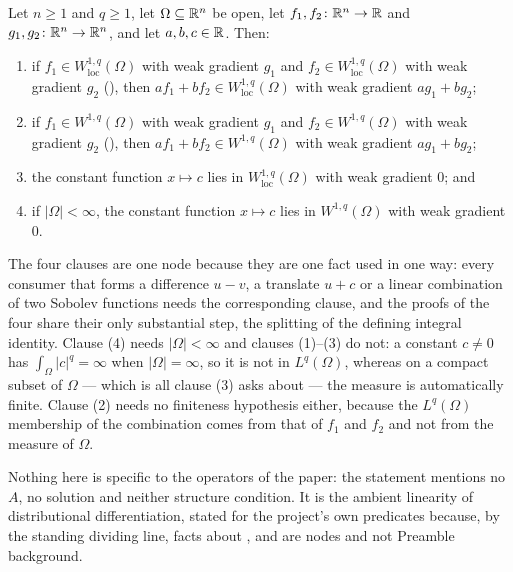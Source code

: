 \begin{lemma}
Let $n\ge1$ and $q\ge1$, let $\Omega\subseteq\mathbb{R}^n$ be open, let
$f_1,f_2\colon\mathbb{R}^n\to\mathbb{R}$ and $g_1,g_2\colon\mathbb{R}^n\to\mathbb{R}^n$, and let
$a,b,c\in\mathbb{R}$.  Then:
\begin{enumerate}
\item if $f_1\in W^{1,q}_{\mathrm{loc}}(\Omega)$ with weak gradient $g_1$ and
  $f_2\in W^{1,q}_{\mathrm{loc}}(\Omega)$ with weak gradient $g_2$
  (), then
  $af_1+bf_2\in W^{1,q}_{\mathrm{loc}}(\Omega)$ with weak gradient
  $ag_1+bg_2$;
\item if $f_1\in W^{1,q}(\Omega)$ with weak gradient $g_1$ and
  $f_2\in W^{1,q}(\Omega)$ with weak gradient $g_2$ (), then
  $af_1+bf_2\in W^{1,q}(\Omega)$ with weak gradient $ag_1+bg_2$;
\item the constant function $x\mapsto c$ lies in
  $W^{1,q}_{\mathrm{loc}}(\Omega)$ with weak gradient $0$; and
\item if $|\Omega|<\infty$, the constant function $x\mapsto c$ lies in
  $W^{1,q}(\Omega)$ with weak gradient $0$.
\end{enumerate}

The four clauses are one node because they are one fact used in one way: every
consumer that forms a difference $u-v$, a translate $u+c$ or a linear
combination of two Sobolev functions needs the corresponding clause, and the
proofs of the four share their only substantial step, the splitting of the
defining integral identity.  Clause (4) needs $|\Omega|<\infty$ and clauses
(1)--(3) do not: a constant $c\ne0$ has $\int_\Omega|c|^q=\infty$ when
$|\Omega|=\infty$, so it is not in $L^q(\Omega)$, whereas on a compact subset of
$\Omega$ --- which is all clause (3) asks about --- the measure is automatically
finite.  Clause (2) needs no finiteness hypothesis either, because the
$L^q(\Omega)$ membership of the combination comes from that of $f_1$ and $f_2$
and not from the measure of $\Omega$.

Nothing here is specific to the operators of the paper: the statement mentions
no $A$, no solution and neither structure condition.  It is the ambient
linearity of distributional differentiation, stated for the project's own
predicates because, by the standing dividing line, facts about
,  and  are
nodes and not Preamble background.
\end{lemma}
